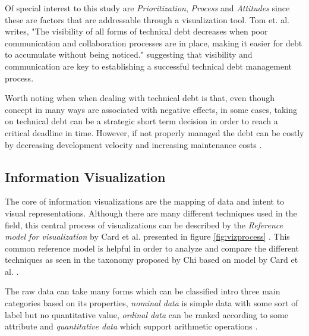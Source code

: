 Of special interest to this study are \textit{Prioritization}, \textit{Process} and \textit{Attitudes} since these are factors that are addressable through a visualization tool.
Tom et. al. writes, "The visibility of all forms of technical debt decreases when poor communication and collaboration processes are in place, making it easier for debt to accumulate without being noticed." \cite{tom_exploration_2013} suggesting that visibility and communication are key to establishing a successful technical debt management process.

Worth noting when when dealing with technical debt is that, even though concept in many ways are associated with negative effects, in some cases, taking on technical debt can be a strategic short term decision in order to reach a critical deadline in time.
However, if not properly managed the debt can be costly by decreasing development velocity and increasing maintenance costs \cite{seaman_using_2012}.

\subsection{Information Visualization}

The core of information visualizations are the mapping of data and intent to visual representations.
Although there are many different techniques used in the field, this central process of visualizations can be described by the \textit{Reference model for visualization} by Card et al. presented in figure \ref{fig:vizprocess} \cite{card_readings_1999}. 
This common reference model is helpful in order to analyze and compare the different techniques as seen in the taxonomy proposed by Chi based on model by Card et al. \cite{chi_taxonomy_2000}.



The raw data can take many forms which can be classified intro three main categories based on its properties, \textit{nominal data} is simple data with some sort of label but no quantitative value, \textit{ordinal data} can be ranked according to some attribute and \textit{quantitative data} which support arithmetic operations \cite{card_structure_1997}.
